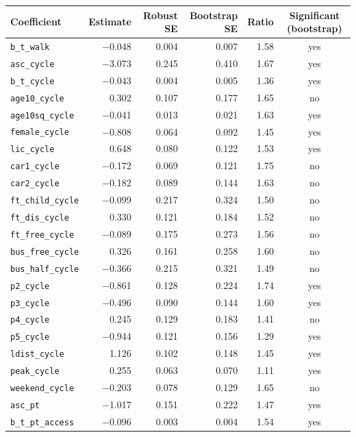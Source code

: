 \begin{longtable}{lrrrrc}
\toprule
Coefficient & Estimate & Robust SE & Bootstrap SE & Ratio & Significant (bootstrap)\\
\midrule
\endhead
\texttt{b\_t\_walk} & $-$0.048 & 0.004 & 0.007 & 1.58 & yes \\
\texttt{asc\_cycle} & $-$3.073 & 0.245 & 0.410 & 1.67 & yes \\
\texttt{b\_t\_cycle} & $-$0.043 & 0.004 & 0.005 & 1.36 & yes \\
\texttt{age10\_cycle} & 0.302 & 0.107 & 0.177 & 1.65 & no \\
\texttt{age10sq\_cycle} & $-$0.041 & 0.013 & 0.021 & 1.63 & yes \\
\texttt{female\_cycle} & $-$0.808 & 0.064 & 0.092 & 1.45 & yes \\
\texttt{lic\_cycle} & 0.648 & 0.080 & 0.122 & 1.53 & yes \\
\texttt{car1\_cycle} & $-$0.172 & 0.069 & 0.121 & 1.75 & no \\
\texttt{car2\_cycle} & $-$0.182 & 0.089 & 0.144 & 1.63 & no \\
\texttt{ft\_child\_cycle} & $-$0.099 & 0.217 & 0.324 & 1.50 & no \\
\texttt{ft\_dis\_cycle} & 0.330 & 0.121 & 0.184 & 1.52 & no \\
\texttt{ft\_free\_cycle} & $-$0.089 & 0.175 & 0.273 & 1.56 & no \\
\texttt{bus\_free\_cycle} & 0.326 & 0.161 & 0.258 & 1.60 & no \\
\texttt{bus\_half\_cycle} & $-$0.366 & 0.215 & 0.321 & 1.49 & no \\
\texttt{p2\_cycle} & $-$0.861 & 0.128 & 0.224 & 1.74 & yes \\
\texttt{p3\_cycle} & $-$0.496 & 0.090 & 0.144 & 1.60 & yes \\
\texttt{p4\_cycle} & 0.245 & 0.129 & 0.183 & 1.41 & no \\
\texttt{p5\_cycle} & $-$0.944 & 0.121 & 0.156 & 1.29 & yes \\
\texttt{ldist\_cycle} & 1.126 & 0.102 & 0.148 & 1.45 & yes \\
\texttt{peak\_cycle} & 0.255 & 0.063 & 0.070 & 1.11 & yes \\
\texttt{weekend\_cycle} & $-$0.203 & 0.078 & 0.129 & 1.65 & no \\
\texttt{asc\_pt} & $-$1.017 & 0.151 & 0.222 & 1.47 & yes \\
\texttt{b\_t\_pt\_access} & $-$0.096 & 0.003 & 0.004 & 1.54 & yes \\

\end{longtable}
